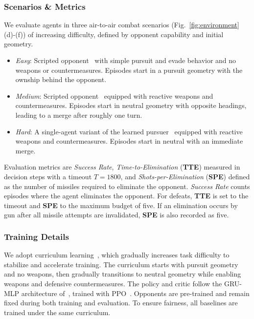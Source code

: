 \subsubsection{Scenarios \& Metrics}
We evaluate agents in three air-to-air combat scenarios (Fig.~\ref{fig:environment}(d)-(f)) of increasing difficulty, defined by opponent capability and initial geometry.
\begin{itemize}
    \item \emph{Easy}: Scripted opponent~\cite{liu2022light} with simple pursuit and evade behavior and no weapons or countermeasures. Episodes start in a pursuit geometry with the ownship behind the opponent.
    \item \emph{Medium}: Scripted opponent~\cite{liu2022light} equipped with reactive weapons and countermeasures. Episodes start in neutral geometry with opposite headings, leading to a merge after roughly one turn.
    \item \emph{Hard}: A single-agent variant of the learned pursuer~\cite{he2023autonomous} equipped with reactive weapons and countermeasures. Episodes start in neutral with an immediate merge.
\end{itemize}
Evaluation metrics are \emph{Success Rate}, \emph{Time-to-Elimination} (\textbf{TTE}) measured in decision steps with a timeout $T=1800$, and \emph{Shots-per-Elimination} (\textbf{SPE}) defined as the number of missiles required to eliminate the opponent.
\emph{Success Rate} counts episodes where the agent eliminates the opponent.
For defeats, \textbf{TTE} is set to the timeout and \textbf{SPE} to the maximum budget of five.
If an elimination occurs by gun after all missile attempts are invalidated, \textbf{SPE} is also recorded as five.

\subsubsection{Training Details}
We adopt curriculum learning~\cite{bae2023deep}, which gradually increases task difficulty to stabilize and accelerate training.
The curriculum starts with pursuit geometry and no weapons, then gradually transitions to neutral geometry while enabling weapons and defensive countermeasures.
The policy and critic follow the GRU-MLP architecture of~\cite{bae2023deep}, trained with PPO~\cite{schulman2017proximal}.
Opponents are pre-trained and remain fixed during both training and evaluation.
To ensure fairness, all baselines are trained under the same curriculum.